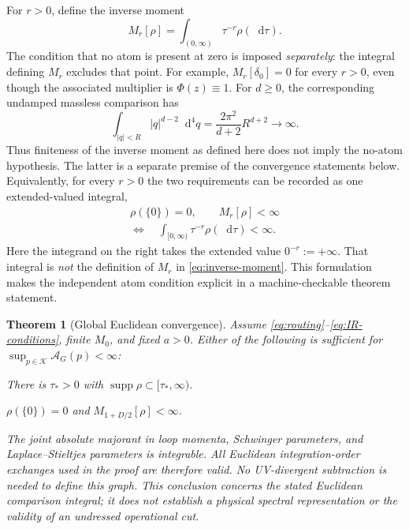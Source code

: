 \documentclass[final,5p,times,twocolumn,numbers,nopreprintline]{elsarticle}
\numberwithin{equation}{section}
\newtheorem{theorem}{Theorem}[section]
\theoremstyle{definition}
\theoremstyle{remark}
\newcommand{\dd}{\mathop{}\!\mathrm d}
\newcommand{\Ph}{\Phi}
\newcommand{\supp}{\operatorname{supp}}
\newcommand{\Mzero}{M_0}
\begin{document}
For \(r>0\), define the inverse moment
\begin{equation}
 M_r[\rho]=\int_{(0,\infty)}\tau^{-r}\rho(\dd\tau).
 \label{eq:inverse-moment}
\end{equation}
The condition that no atom is present at zero is imposed
\emph{separately}: the integral defining $M_r$ excludes that point.
For example, $M_r[\delta_0]=0$ for every $r>0$, even though the
associated multiplier is $\Ph(z)\equiv1$. For $d\geq0$, the
corresponding undamped massless comparison has
\[
 \int_{|q|<R}|q|^{d-2}\dd^4q
    =\frac{2\pi^2}{d+2}R^{d+2}\longrightarrow\infty.
\]
Thus finiteness of the inverse moment as defined here does not imply
the no-atom hypothesis. The latter is a separate premise of the
convergence statements below. Equivalently, for every $r>0$ the two
requirements can be recorded as one extended-valued integral,
\begin{equation}
 \begin{gathered}
 \rho(\{0\})=0,\qquad M_r[\rho]<\infty\\
 \Longleftrightarrow\quad
 \int_{[0,\infty)}\tau^{-r}\rho(\dd\tau)<\infty.
 \end{gathered}
 \label{eq:extended-inverse-moment}
\end{equation}
Here the integrand on the right takes the extended value
$0^{-r}:=+\infty$. That integral is \emph{not} the definition
of $M_r$ in \eqref{eq:inverse-moment}. This formulation makes the independent
atom condition explicit in a machine-checkable theorem statement.

\begin{theorem}[Global Euclidean convergence]
\label{thm:global-uv}
Assume \eqref{eq:routing}--\eqref{eq:IR-conditions}, finite
\(\Mzero\), and fixed \(a>0\). Either of the following is sufficient
for \(\sup_{p\in\mathcal K}\mathcal A_G(p)<\infty\):
\begin{description}[leftmargin=1cm]
\item[(G)] There is \(\tau_*>0\) with
\(\supp\rho\subset[\tau_*,\infty)\).
\item[(M)] \(\rho(\{0\})=0\) and
\(M_{1+D/2}[\rho]<\infty\).
\end{description}
The joint absolute majorant in loop momenta, Schwinger parameters,
and Laplace--Stieltjes parameters is integrable. All Euclidean
integration-order exchanges used in the proof are therefore valid.
No UV-divergent subtraction is needed to define this graph.
This conclusion concerns the stated Euclidean comparison integral;
it does not establish a physical spectral representation or the
validity of an undressed operational cut.
\end{theorem}
\end{document}
